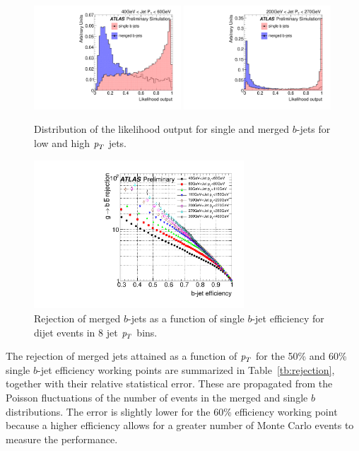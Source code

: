 \begin{figure}[tp]
\centering
\includegraphics[width=0.49\textwidth]{FIGS/Likelihood/NNoutput040_LihoodKDE.pdf}
\includegraphics[width=0.49\textwidth]{FIGS/Likelihood/NNoutput200_LihoodKDE.pdf}  
\caption{Distribution of the likelihood output for single and merged $b$-jets for low and high ${\emph{p}_{T}}$ jets.}
\label{fig:outputinbins}
\end{figure}

\begin{figure}[tp]
\centering
\includegraphics[width=0.7\textwidth]{FIGS/Likelihood/KDE_RejvsEff.pdf}
\caption{Rejection of merged $b$-jets as a function of single $b$-jet efficiency for dijet events in 8 jet ${\emph{p}_{T}}$ bins.}
\label{fig:performanceinbins}
\end{figure}


The rejection of merged jets attained as a function of ${\emph{p}_{T}}$ for the 50\% and 60\% single $b$-jet efficiency working points are summarized in Table~\ref{tb:rejection}, together with their relative statistical error. These are propagated from the Poisson fluctuations of the number of events in the merged and single $b$ distributions. The error is slightly lower for the 60\% efficiency working point because a higher efficiency allows for a greater number of Monte Carlo events to measure the performance. %




